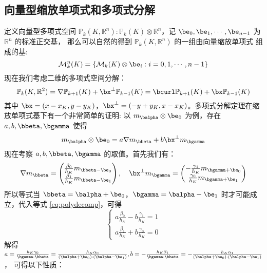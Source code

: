\subsection{向量型缩放单项式和多项式分解}
定义向量型多项式空间 $\mathbb{P}_k(K, \mathbb{R}^n): \mathbb{P}_k(K) \otimes 
\mathbb{R}^n$，记 $\be_0, \be_1, \cdots, \be_{n-1}$ 为 $\mathbb{R}^n$ 的标准正交基，
那么可以自然的得到 $\mathbb{P}_k(K, \mathbb{R}^n)$ 的一组由向量缩放单项式
组成的基:
$$
\mathcal{M}_k^n(K) = \{\mathcal{M}_k(K)\otimes \be_i: i = 0, 1, \cdots, n-1\}
$$
现在我们考虑二维的多项式空间分解：
$$
\mathbb{P}_k(K, \mathbb{R}^2) = \nabla \mathbb{P}_{k+1}(K) + \bx^{\perp}
\mathbb{P}_{k-1}(K)
= \bcurl \mathbb{P}_{k+1}(K) + \bx\mathbb{P}_{k-1}(K)
$$
其中 $\bx = (x- x_K, y - y_K)$，$\bx^{\perp} = (-y + y_K, x -
x_K)$。多项式分解定理在缩放单项式基下有一个非常简单的证明:
以 $m_{\balpha}\otimes \be_0$ 为例，存在 $a, b, \bbeta, \bgamma$ 使得
\begin{equation}
\label{eq:polydecomp}
m_{\balpha}\otimes \be_0 = a\nabla m_{\bbeta} + b\bx^{\perp}m_{\bgamma}
\end{equation}
现在考察 $a, b, \bbeta, \bgamma$ 的取值。首先我们有：
$$
\nabla m_{\bbeta} = 
\begin{pmatrix}
    \frac{\beta_0}{h_K} m_{\bbeta-\be_0}\\
    \frac{\beta_1}{h_K} m_{\bbeta-\be_1}
\end{pmatrix}, \quad
\bx^{\perp} m_{\bgamma} =
\begin{pmatrix}
    -\frac{\gamma_1}{h_K} m_{\bgamma+\be_0}\\
    \frac{\gamma_0}{h_K} m_{\bgamma+\be_1}
\end{pmatrix}
$$
所以等式当 $\bbeta = \balpha + \be_0$，$\bgamma = \balpha - \be_1$
时才可能成立，代入等式 \eqref{eq:polydecomp}，可得
$$
\begin{cases}
    a \frac{\beta_0}{h_K} - b\frac{\gamma_1}{h_K} = 1\\
    a \frac{\beta_1}{h_K} + b\frac{\gamma_0}{h_K} = 0
\end{cases}
$$
解得 $a = \frac{h_K\gamma_0}{\bgamma\cdot\bbeta} =
\frac{h_K\alpha_0}{(\balpha+ \be_0)\cdot(\balpha-\be_1)},
b =-
\frac{h_K\beta_1}{\bgamma\cdot\bbeta} = 
-\frac{h_K\alpha_1}{(\balpha+ \be_0)\cdot(\balpha-\be_1)}$，
可得以下性质：
